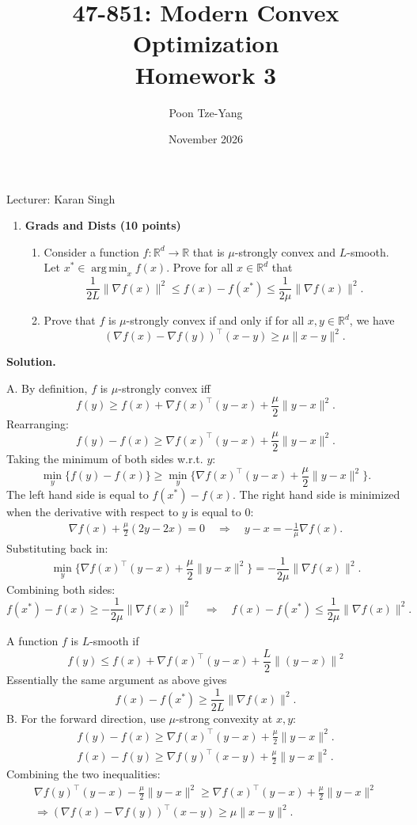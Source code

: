 \documentclass[11pt,letterpaper]{article}
\title{47-851: Modern Convex Optimization \\ Homework 3}
\author{Poon Tze-Yang}
\date{November 2026}
\theoremstyle{definition}
\newcommand{\reals}{\mathbb{R}}
\newcommand{\argmin}{\operatorname*{arg\,min}}
\newcommand{\solution}{\medskip\noindent\textbf{Solution.}\par\medskip}
\begin{document}
\maketitle

\noindent Lecturer: Karan Singh

\begin{enumerate}[series=q]
\item \textbf{Grads and Dists (10 points)}
\begin{enumerate}[label=\textbf{Part \Alph*.}, leftmargin=*]
\item Consider a function $f : \reals^d \to \reals$ that is $\mu$-strongly convex and $L$-smooth. Let $x^* \in \argmin_x f(x)$. Prove for all $x \in \reals^d$ that
\[
\frac{1}{2L}\|\nabla f(x)\|^2 \leq f(x) - f(x^*) \leq \frac{1}{2\mu}\|\nabla f(x)\|^2.
\]
\item Prove that $f$ is $\mu$-strongly convex if and only if for all $x, y \in \reals^d$, we have
\[
(\nabla f(x) - \nabla f(y))^\top (x - y) \geq \mu\|x - y\|^2.
\]
\end{enumerate}
\end{enumerate}

\solution
A.
By definition, $f$ is $\mu$-strongly convex iff
\[
f(y) \geq f(x) + \nabla f(x)^\top (y-x) + \frac{\mu}{2}\|y-x\|^2.
\]
Rearranging:
\[
f(y) -f(x) \geq \nabla f(x)^\top (y-x) + \frac{\mu}{2}\|y-x\|^2.
\]
Taking the minimum of both sides w.r.t. $y$:
\[
\min_y\{f(y) -f(x)\} \geq \min_y\{\nabla f(x)^\top (y-x) + \frac{\mu}{2}\|y-x\|^2\}.
\]
The left hand side is equal to $f(x^*)-f(x)$.
The right hand side is minimized when the derivative with respect to $y$ is equal to 0:
\begin{align*}
    \nabla f(x) + \frac{\mu}{2}(2y-2x) = 0\quad\Rightarrow\quad y -x = -\frac{1}{\mu}\nabla f(x).
\end{align*}
Substituting back in:
\[
\min_y\{\nabla f(x)^\top (y-x) + \frac{\mu}{2}\|y-x\|^2\} = -\frac{1}{2\mu}\|\nabla f(x)\| ^2.
\]
Combining both sides:
\[
f(x^*) - f(x) \geq -\frac{1}{2\mu}\|\nabla f(x)\| ^2 \quad\Rightarrow\quad f(x) - f(x^*)  \leq \frac{1}{2\mu}\|\nabla f(x)\| ^2.
\]

A function $f$ is $L$-smooth if
\[
f(y)\leq f(x) + \nabla f(x)^\top(y-x) + \frac{L}{2}\left\|(y-x)\right\|^2
\]
Essentially the same argument as above gives 
\[
f(x)-f(x^*) \geq \frac{1}{2L}\|\nabla f(x)\|^2.
\]
\medskip
B.
For the forward direction, use $\mu$-strong convexity at $x,y$:
\begin{align*}
    f(y) - f(x) \geq \nabla f(x)^\top (y-x) + \frac{\mu}{2}\|y-x\|^2. \\
    f(x) - f(y) \geq \nabla f(y)^\top (x-y) + \frac{\mu}{2}\|y-x\|^2.
\end{align*}
Combining the two inequalities:
\begin{align*}
    \nabla f(y)^\top (y-x) - \frac{\mu}{2}\|y-x\|^2 \geq \nabla f(x)^\top (y-x) + \frac{\mu}{2}\|y-x\|^2 \\
    \Rightarrow (\nabla f(x) - \nabla f(y))^\top (x - y) \geq \mu\|x - y\|^2.
\end{align*}
\end{document}
